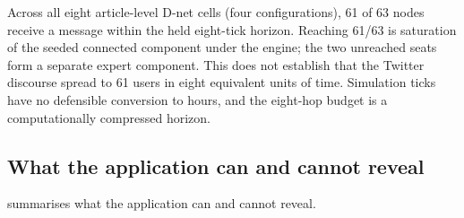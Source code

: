 Across all eight article-level D-net cells (four configurations), 61 of 63
nodes receive a message within the held eight-tick horizon. Reaching 61/63
is saturation of the seeded connected component under the engine; the two
unreached seats form a separate expert component. This does not establish
that the Twitter discourse spread to 61 users in eight equivalent units of
time.
Simulation ticks have no defensible conversion to hours, and the eight-hop
budget is a computationally compressed horizon.

\subsection{What the application can and cannot reveal}

 summarises what the application can and
cannot reveal.

